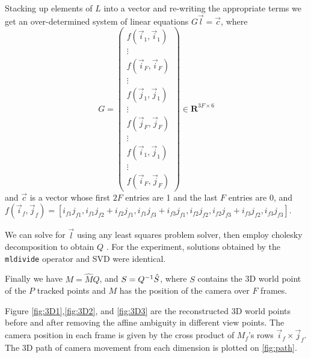 Stacking up elements of $L$ into a vector and re-writing the appropriate terms
we get an over-determined system of linear equations $G\vec l = \vec
c$, where $$
  G = \begin{pmatrix}
    f(\vec i_1, \vec i_1) \\ \vdots \\f(\vec i_F, \vec i_F) \\ \vdots \\
    f(\vec j_1, \vec j_1) \\ \vdots \\    f(\vec j_F, \vec j_F) \\ \vdots \\
    f(\vec i_1, \vec j_1) \\ \vdots \\f(\vec i_F, \vec j_F)
  \end{pmatrix}\in \mathbf{R}^{3F\times 6}$$
 and $\vec c$ is a vector whose first $2F$ entries are 1 and the last
 $F$ entries are 0, and $f(\vec i_f, \vec j_f) = [i_{f1}j_{f1},
 i_{f1}j_{f2}+i_{f2}j_{f1}, i_{f1}j_{f3}+i_{f3}j_{f1}, i_{f2}j_{f2},
 i_{f2}j_{f3}+i_{f3}j_{f2}, i_{f3}j_{f3}]$.

We can solve for $\vec l$ using any least squares problem solver, then
employ cholesky decomposition to obtain $Q$ \cite{Morita}. For the
experiment, solutions obtained by the \texttt{mldivide} operator and
SVD were identical.

Finally we have $M = \hat MQ$, and $S =Q^{-1} \hat S$, where $S$
contains the 3D world point of the $P$ tracked points and $M$ has the
position of the camera over $F$ frames. 

Figure \ref{fig:3D1},\ref{fig:3D2}, and \ref{fig:3D3} are the
reconstructed 3D world points before and after removing the affine
ambiguity in different view points.
The camera position in each frame is given by the cross product of
$M_f$'s rows $\vec i_f \times \vec j_f$. The 3D path of camera
movement from each dimension is plotted on \ref{fig:path}.


